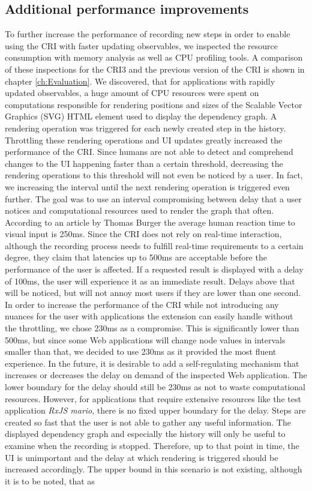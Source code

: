 \subsection{Additional performance improvements}
\label{sec:additonPerformance} %
To further increase the performance of recording new steps in order to enable using the CRI with faster updating observables, we inspected the resource consumption with memory analysis as well as CPU profiling tools. A comparison of these inspections for the CRI3 and the previous version of the CRI is shown in chapter \ref{ch:Evaluation}. We discovered, that for applications with rapidly updated observables, a huge amount of CPU resources were spent on computations responsible for rendering positions and sizes of the Scalable Vector Graphics (SVG) HTML element used to display the dependency graph. A rendering operation was triggered for each newly created step in the history. Throttling these rendering operations and UI updates greatly increased the performance of the CRI. Since humans are not able to detect and comprehend changes to the UI happening faster than a certain threshold, decreasing the rendering operations to this threshold will not even be noticed by a user. In fact, we increasing the interval until the next rendering operation is triggered even further. The goal was to use an interval compromising between delay that a user notices and computational resources used to render the graph that often. According to an article by Thomas Burger \cite{Perception} the average human reaction time to visual input is 250ms. Since the CRI does not rely on real-time interaction, although the recording process needs to fulfill real-time requirements to a certain degree, they claim that latencies up to 500ms are acceptable before the performance of the user is affected. If a requested result is displayed with a delay of 100ms, the user will experience it as an immediate result. Delays above that will be noticed, but will not annoy most users if they are lower than one second. In order to increase the performance of the CRI while not introducing any nuances for the user with applications the extension can easily handle without the throttling, we chose 230ms as a compromise. This is significantly lower than 500ms, but since some Web applications will change node values in intervals smaller than that, we decided to use 230ms as it provided the most fluent experience. In the future, it is desirable to add a self-regulating mechanism that increases or decreases the delay on demand of the inspected Web application. The lower boundary for the delay should still be 230ms as not to waste computational resources. However, for applications that require extensive resources like the test application \emph{RxJS mario}, there is no fixed upper boundary for the delay. Steps are created so fast that the user is not able to gather any useful information. The displayed dependency graph and especially the history will only be useful to examine when the recording is stopped. Therefore, up to that point in time, the UI is unimportant and the delay at which rendering is triggered should be increased accordingly. The upper bound in this scenario is not existing, although it is to be noted, that as 